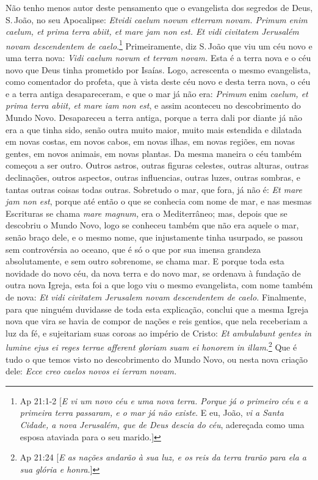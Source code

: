 Não tenho menos autor deste pensamento que o evangelista dos segredos de
Deus, S.\,João, no seu Apocalipse: \emph{Etvidi caelum novum etterram
novam. Primum enim caelum, et prima terra abiit, et mare jam non est. Et
vidi civitatem Jerusalém novam descendentem de caelo}.\footnote{Ap 21:1-2 [\emph{E vi um novo céu e uma nova terra. Porque já o primeiro céu e a primeira terra
passaram, e o mar já não existe}. E eu, João, \emph{vi a Santa Cidade, a nova Jerusalém, que de Deus descia do céu}, adereçada como uma esposa ataviada para o seu marido.]}
Primeiramente, diz S.\,João que viu um céu novo e uma terra
nova: \emph{Vidi caelum novum et terram novam.} Esta é a terra nova e o
céu novo que Deus tinha prometido por Isaías. Logo, acrescenta o mesmo
evangelista, como comentador do profeta, que à vista deste céu novo e
desta terra nova, o céu e a terra antiga desapareceram, e que o mar já
não era: \emph{Primum} enim \emph{caelum, et prima terra abiit, et mare
iam non est}, e assim aconteceu no descobrimento do Mundo Novo.
Desapareceu a terra antiga, porque a terra dali por diante já não era a
que tinha sido, senão outra muito maior, muito mais estendida e dilatada
em novas costas, em novos cabos, em novas ilhas, em novas regiões, em
novas gentes, em novos animais, em novas plantas. Da mesma maneira o céu
também começou a ser outro. Outros astros, outras figuras celestes,
outras alturas, outras declinações, outros aspectos, outras influencias,
outras luzes, outras sombras, e tantas outras coisas todas outras.
Sobretudo o mar, que fora, já não é: \emph{Et mare jam non est},
porque até então o que se conhecia com nome de mar, e nas mesmas
Escrituras se chama \emph{mare magnum,} era o Mediterrâneo; mas, depois
que se descobriu o Mundo Novo, logo se conheceu também que não era
aquele o mar, senão braço dele, e o mesmo nome, que injustamente tinha
usurpado, se passou sem controvérsia ao oceano, que é só o que por sua
imensa grandeza absolutamente, e sem outro sobrenome, se chama mar. E
porque toda esta novidade do novo céu, da nova terra e do novo mar, se
ordenava à fundação de outra nova Igreja, esta foi a que logo viu o
mesmo evangelista, com nome também de nova: \emph{Et vidi civitatem
Jerusalem novam descendentem de caelo.} Finalmente, para que ninguém
duvidasse de toda esta explicação, conclui que a mesma Igreja nova que
vira se havia de compor de nações e reis gentios, que nela receberiam a
luz da fé, e sujeitariam suas coroas ao império de Cristo: \emph{Et
ambulabunt gentes in lumine ejus ei reges terrae afferent gloriam suam
ei honorem in illam}.\footnote{Ap 21:24 [\emph{E as nações andarão à sua luz, e os reis da terra trarão para ela a sua glória e honra}.]} Que é tudo o que temos visto
no descobrimento do Mundo Novo, ou nesta nova criação dele: \emph{Ecce
creo caelos novos ei íerram novam.}

